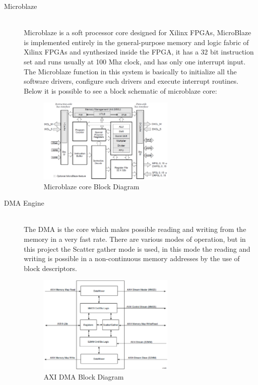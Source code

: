 \begin{description}
	\item[Microblaze] \hfill \\

Microblaze is a soft processor core designed for Xilinx FPGAs, MicroBlaze is
implemented entirely in the general-purpose memory and logic fabric of Xilinx
FPGAs and synthesized inside the FPGA, it has a 32 bit instruction set and runs
usually at 100 Mhz clock, and has only one interrupt input. The Microblaze function
in this system is basically to initialize all the software drivers, configure
such drivers and execute interrupt routines.\\

Below it is possible to see a block schematic of microblaze core:

\begin{figure}[htbp]
    \centering
    \includegraphics[width=0.65\textwidth]{./figures/mb_bd}
    \caption{ Microblaze core Block Diagram
    \label{fig:mbbd}}
\end{figure}

	\item[DMA Engine] \hfill \\

  The DMA is the core which makes possible reading and writing from the memory in
a very fast rate. There are various modes of operation, but in this project the
Scatter gather mode is used, in this mode the reading and writing is possible in
a non-continuous memory addresses by the use of block descriptors.

\begin{figure}[htbp]
    \centering
    \includegraphics[width=0.65\textwidth]{./figures/dma_bd}
    \caption{ AXI DMA Block Diagram
    \label{fig:dmabd}}
\end{figure}


\end{description}
